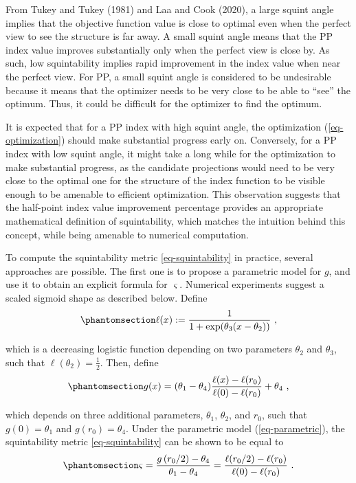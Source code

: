 \documentclass[
  12pt,
]{interact}
\theoremstyle{plain}
\begin{document}
From Tukey and Tukey (1981) and Laa and Cook (2020), a large squint
angle implies that the objective function value is close to optimal even
when the perfect view to see the structure is far away. A small squint
angle means that the PP index value improves substantially only when the
perfect view is close by. As such, low squintability implies rapid
improvement in the index value when near the perfect view. For PP, a
small squint angle is considered to be undesirable because it means that
the optimizer needs to be very close to be able to ``see'' the optimum.
Thus, it could be difficult for the optimizer to find the optimum.

It is expected that for a PP index with high squint angle, the
optimization (\ref{eq-optimization}) should make substantial progress
early on. Conversely, for a PP index with low squint angle, it might
take a long while for the optimization to make substantial progress, as
the candidate projections would need to be very close to the optimal one
for the structure of the index function to be visible enough to be
amenable to efficient optimization. This observation suggests that the
half-point index value improvement percentage provides an appropriate
mathematical definition of squintability, which matches the intuition
behind this concept, while being amenable to numerical computation.

To compute the squintability metric \eqref{eq-squintability} in
practice, several approaches are possible. The first one is to propose a
parametric model for \(g\), and use it to obtain an explicit formula for
\(\varsigma\). Numerical experiments suggest a scaled sigmoid shape as
described below. Define
\begin{equation}\phantomsection\label{eq-logistic}{
\ell(x):=\frac{1}{1+\exp(\theta_{3}(x-\theta_{2}))}\ ,
}\end{equation}

which is a decreasing logistic function depending on two parameters
\(\theta_2\) and \(\theta_3\), such that
\(\ell(\theta_{2})=\frac{1}{2}\). Then, define
\begin{equation}\phantomsection\label{eq-parametric}{
g(x)=(\theta_{1}-\theta_{4})\frac{\ell(x)-\ell(r_0)}{\ell(0)-\ell(r_0)}+\theta_{4}\ ,
}\end{equation}

which depends on three additional parameters, \(\theta_1\),
\(\theta_2\), and \(r_0\), such that \(g(0)=\theta_1\) and
\(g(r_0)=\theta_4\). Under the parametric model (\ref{eq-parametric}),
the squintability metric \eqref{eq-squintability} can be shown to be
equal to
\begin{equation}\phantomsection\label{eq-squintability-parametric}{
\varsigma=\frac{g\left(r_{0}/2\right)-\theta_{4}}{\theta_{1}-\theta_{4}}=\frac{\ell(r_0/2)-\ell(r_0)}{\ell(0)-\ell(r_0)}\ .
}\end{equation}
\end{document}

